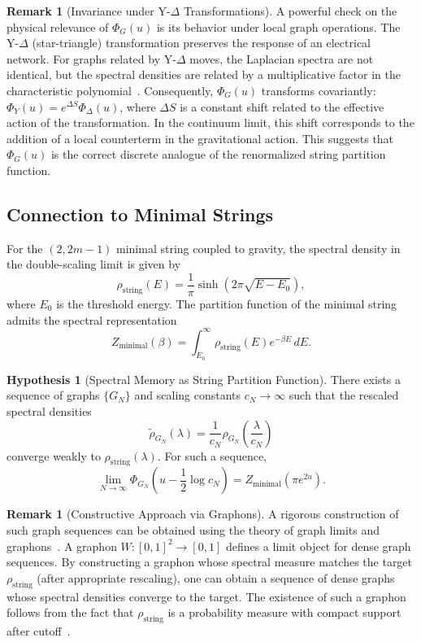 \documentclass[12pt]{article}
\theoremstyle{definition}
\newtheorem{remark}[theorem]{Remark}
\newtheorem{hypothesis}[theorem]{Hypothesis}
\begin{document}
\begin{remark}[Invariance under Y-$\Delta$ Transformations]\label{rem:ydelta}
A powerful check on the physical relevance of $\Phi_G(u)$ is its behavior under local graph operations. The Y-$\Delta$ (star-triangle) transformation preserves the response of an electrical network. For graphs related by Y-$\Delta$ moves, the Laplacian spectra are not identical, but the spectral densities are related by a multiplicative factor in the characteristic polynomial~\cite{Sokal2005}. Consequently, $\Phi_G(u)$ transforms covariantly: $\Phi_{Y}(u) = e^{\Delta S} \Phi_{\Delta}(u)$, where $\Delta S$ is a constant shift related to the effective action of the transformation. In the continuum limit, this shift corresponds to the addition of a local counterterm in the gravitational action. This suggests that $\Phi_G(u)$ is the correct discrete analogue of the renormalized string partition function.
\end{remark}

\subsection{Connection to Minimal Strings}
For the $(2,2m-1)$ minimal string coupled to gravity, the spectral density in the double-scaling limit is given by~\cite{Saad2019, Belavin2023}
\[
\rho_{\text{string}}(E) = \frac{1}{\pi} \sinh\left(2\pi \sqrt{E - E_0}\right),
\]
where $E_0$ is the threshold energy. The partition function of the minimal string admits the spectral representation
\[
Z_{\text{minimal}}(\beta) = \int_{E_0}^\infty \rho_{\text{string}}(E) e^{-\beta E} \, dE.
\]

\begin{hypothesis}[Spectral Memory as String Partition Function]\label{hyp:minimal}
There exists a sequence of graphs $\{G_N\}$ and scaling constants $c_N \to \infty$ such that the rescaled spectral densities
\[
\tilde{\rho}_{G_N}(\lambda) = \frac{1}{c_N} \rho_{G_N}\left(\frac{\lambda}{c_N}\right)
\]
converge weakly to $\rho_{\text{string}}(\lambda)$. For such a sequence,
\[
\lim_{N \to \infty} \Phi_{G_N}\left(u - \frac{1}{2}\log c_N\right) = Z_{\text{minimal}}(\pi e^{2u}).
\]
\end{hypothesis}

\begin{remark}[Constructive Approach via Graphons]
A rigorous construction of such graph sequences can be obtained using the theory of graph limits and graphons~\cite{Lovasz2012}. A graphon $W: [0,1]^2 \to [0,1]$ defines a limit object for dense graph sequences. By constructing a graphon whose spectral measure matches the target $\rho_{\text{string}}$ (after appropriate rescaling), one can obtain a sequence of dense graphs whose spectral densities converge to the target. The existence of such a graphon follows from the fact that $\rho_{\text{string}}$ is a probability measure with compact support after cutoff~\cite{Borgs2012}.
\end{remark}
\end{document}
